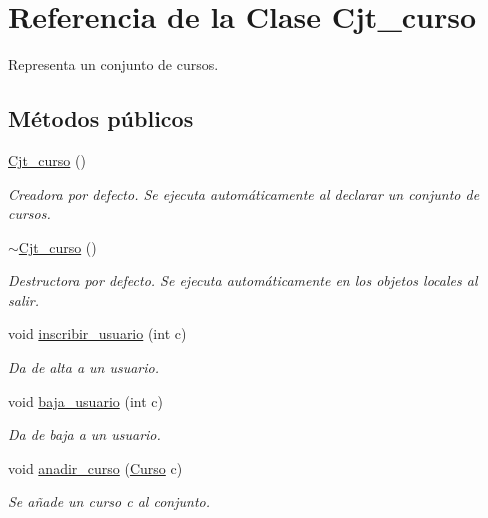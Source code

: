 \hypertarget{class_cjt__curso}{}\section{Referencia de la Clase Cjt\+\_\+curso}
\label{class_cjt__curso}


Representa un conjunto de cursos.  


\subsection*{Métodos públicos}
\begin{DoxyCompactItemize}
\item 
\mbox{\hyperlink{class_cjt__curso_ab19c9d9a6f98d893563fba7b38fe8cbb}{Cjt\+\_\+curso}} ()
\begin{DoxyCompactList}\small\item\em Creadora por defecto. Se ejecuta automáticamente al declarar un conjunto de cursos. \end{DoxyCompactList}\item 
\mbox{\hyperlink{class_cjt__curso_a8e50124d09c12ae21fe3afeb916313f4}{$\sim$\+Cjt\+\_\+curso}} ()
\begin{DoxyCompactList}\small\item\em Destructora por defecto. Se ejecuta automáticamente en los objetos locales al salir. \end{DoxyCompactList}\item 
void \mbox{\hyperlink{class_cjt__curso_ae5cf07c6e8883a244c7557e446490254}{inscribir\+\_\+usuario}} (int c)
\begin{DoxyCompactList}\small\item\em Da de alta a un usuario. \end{DoxyCompactList}\item 
void \mbox{\hyperlink{class_cjt__curso_a7d41a4d58689e02f10093b56fce7947b}{baja\+\_\+usuario}} (int c)
\begin{DoxyCompactList}\small\item\em Da de baja a un usuario. \end{DoxyCompactList}\item 
void \mbox{\hyperlink{class_cjt__curso_a8b79841cba9bb04c08a23e9dc376dd24}{anadir\+\_\+curso}} (\mbox{\hyperlink{class_curso}{Curso}} c)
\begin{DoxyCompactList}\small\item\em Se añade un curso c al conjunto. \end{DoxyCompactList}\item 

\end{DoxyCompactItemize}
